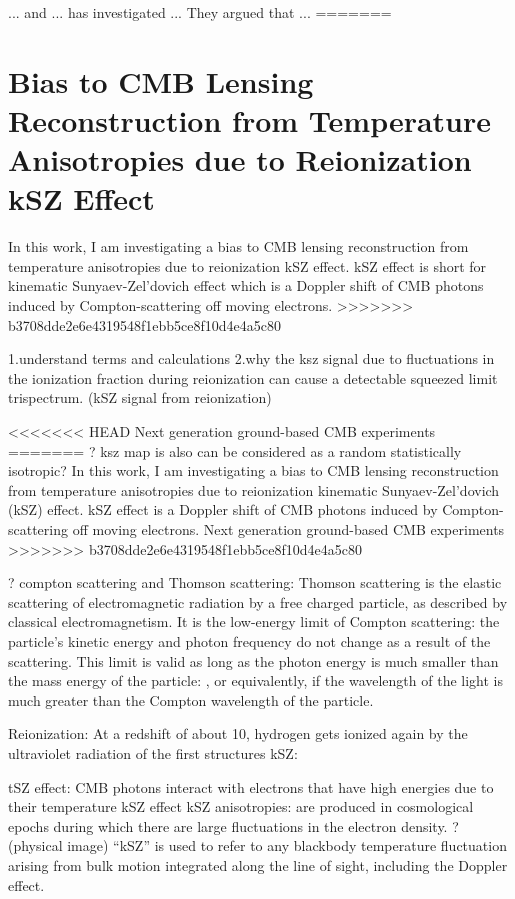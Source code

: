 \documentclass[12pt, notitlepage, onecolumn, amsmath, amssymb, aps]{revtex4-1}
\begin{document}
... and ... has investigated ...
They argued that ...
=======
\section{Bias to CMB Lensing Reconstruction from Temperature Anisotropies due to Reionization kSZ Effect}
\label{sec:org093d799}

In this work, I am investigating a bias to CMB lensing reconstruction from temperature anisotropies due to reionization kSZ effect.
kSZ effect is short for kinematic Sunyaev-Zel'dovich effect which is a Doppler shift of CMB photons induced by Compton-scattering off moving electrons.
>>>>>>> b3708dde2e6e4319548f1ebb5ce8f10d4e4a5c80



1.understand terms and calculations\cite{Ferraro:2017fac} \cite{Alvarez:2015xzu}
2.why the ksz signal due to fluctuations in the ionization fraction during reionization can cause a detectable squeezed limit trispectrum. (kSZ signal from reionization)\cite{Smith:2016lnt}

<<<<<<< HEAD
 Next generation ground-based CMB 
experiments 
=======
? ksz map is also can be considered as a random statistically isotropic?
In this work, I am investigating a bias to CMB lensing reconstruction from temperature anisotropies due to reionization kinematic Sunyaev-Zel'dovich (kSZ) effect. kSZ effect is a Doppler shift of CMB photons induced by Compton-scattering off moving electrons. Next generation ground-based CMB experiments 
>>>>>>> b3708dde2e6e4319548f1ebb5ce8f10d4e4a5c80

? compton scattering and Thomson scattering: Thomson scattering is the elastic scattering of electromagnetic radiation by a free charged particle, as described by classical electromagnetism. It is the low-energy limit of Compton scattering: the particle's kinetic energy and photon frequency do not change as a result of the scattering. This limit is valid as long as the photon energy is much smaller than the mass energy of the particle: , or equivalently, if the wavelength of the light is much greater than the Compton wavelength of the particle.

Reionization: At a redshift of about 10, hydrogen gets ionized again by the ultraviolet radiation of the first structures
kSZ: 



tSZ effect: CMB photons interact with electrons that have high energies due to their temperature
kSZ effect 
kSZ anisotropies: are produced in cosmological epochs during which there are large fluctuations in the electron density. ? (physical image)
``kSZ'' is used to refer to any blackbody temperature fluctuation arising from bulk motion integrated along the line of sight, including the Doppler effect.
\end{document}
